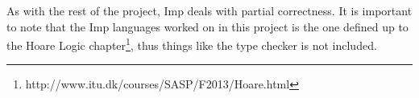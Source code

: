 As with the rest of the project, Imp deals with partial correctness. It is important to note that the Imp languages worked on in this project is the one defined up to the Hoare Logic chapter\footnote{http://www.itu.dk/courses/SASP/F2013/Hoare.html}, thus things like the type checker is not included.


 
